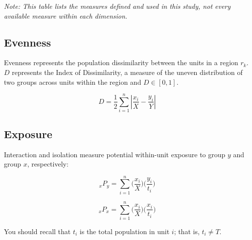 \documentclass{report}[11pt,letterpaper]
\begin{document}
\begin{table}[htbp]
\begin{tabularx}{\textwidth}{@{}p{}
                               p{} X@{}}
\bottomrule
\end{tabularx}

\medskip
\begin{minipage}{\textwidth}
\footnotesize
\em{Note: This table lists the measures defined and used in this study, not every available measure within each dimension}.
\end{minipage}
\end{table}

\subsection{Evenness}

Evenness represents the population dissimilarity between the units in a region $r_k$. $D$ represents the Index of Dissimilarity, a measure of the uneven distribution of two groups across units within the
region and $D \in [0, 1]$. 

\begin{equation}
D = \dfrac{1}{2}
\sum_{i=1}^{n}
\left|
\dfrac{x_i}{X} - \dfrac{y_i}{Y}
\right|
\end{equation}

\subsection{Exposure}

Interaction and isolation measure potential within-unit exposure to group $y$ and group $x$, respectively:

\begin{equation}
_{x}P_{y} = \sum_{i=1}^{n} \Big( \dfrac{x_i}{X} \Big) \Big( \dfrac{y_i}{t_i} \Big)
\end{equation}

\begin{equation}
_{x}P_{x} = \sum_{i=1}^{n} \Big( \dfrac{x_i}{X} \Big) \Big( \dfrac{x_i}{t_i} \Big)
\end{equation}

You should recall that $t_i$ is the total population in unit $i$; that is, $t_i \neq T$.
\end{document}
